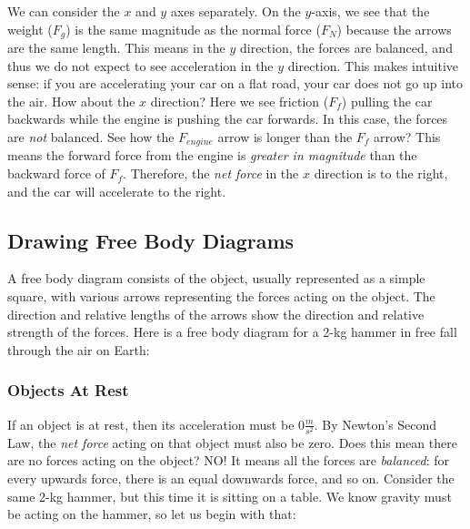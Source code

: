 We can consider the $x$ and $y$ axes separately. On the $y$-axis, we see that 
the weight ($F_g$) is the same magnitude as the normal force ($F_N$) because the arrows are the same length. This 
means in the $y$ direction, the forces are balanced, and thus we do not expect 
to see acceleration in the $y$ direction. This makes intuitive sense: if you are 
accelerating your car on a flat road, your car does not go up into the air. How 
about the $x$ direction? Here we see friction ($F_f$) pulling the car backwards 
while the engine is pushing the car forwards. In this case, the forces are 
\textit{not} balanced. See how the $F_{engine}$ arrow is longer than the $F_f$ 
arrow? This means the forward force from the engine is \textit{greater in magnitude}
than the backward force of $F_f$. Therefore, the \textit{net force} in the $x$ 
direction is to the right, and the car will accelerate to the right. 


\subsection{Drawing Free Body Diagrams}

A free body diagram consists of the object, usually represented as a simple 
square, with various arrows representing the forces acting on the object. The 
direction and relative lengths of the arrows show the direction and relative 
strength of the forces. Here is a free body diagram for a 2-kg hammer in free fall 
through the air on Earth:

\begin{center}
\end{center}


\subsubsection{Objects At Rest}
If an object is at rest, then its acceleration must be $0 \frac{m}{s^2}$. By 
Newton's Second Law, the \textit{net force} acting on that object must also be 
zero. Does this mean there are no forces acting on the object? NO! It means all 
the forces are \textit{balanced}: for every upwards force, there is an equal 
downwards force, and so on. Consider the same 2-kg hammer, but this time it is 
sitting on a table. We know gravity must be acting on the hammer, so let us begin 
with that:

